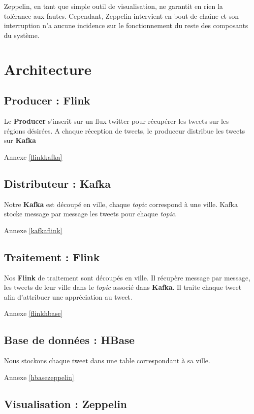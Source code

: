 \documentclass[a4paper,oneside,12pt]{article}
\begin{document}
Zeppelin, en tant que simple outil de visualisation, ne garantit en rien la tolérance aux fautes. Cependant, Zeppelin intervient en bout de chaîne et son interruption n'a aucune incidence sur le fonctionnement du reste des composants du système. 

\pagebreak
\section{Architecture}

\subsection{Producer : Flink}

Le \textbf{Producer} s'inscrit sur un flux twitter pour récupérer les tweets sur les régions désirées. A chaque réception de tweets, le produceur distribue les tweets sur \textbf{Kafka}

Annexe \ref{flinkkafka}

\subsection{Distributeur : Kafka}

Notre \textbf{Kafka} est découpé en ville, chaque \textit{topic} correspond à une ville. Kafka stocke message par message les tweets pour chaque \textit{topic}. 

Annexe \ref{kafkaflink}

\subsection{Traitement : Flink}

Nos \textbf{Flink} de traitement sont découpés en ville. Il récupère message par message, les tweets de leur ville dans le \textit{topic} associé dans \textbf{Kafka}. Il traite chaque tweet afin d'attribuer une appréciation au tweet. 

Annexe \ref{flinkhbase}

\subsection{Base de données : HBase}

Nous stockons chaque tweet dans une table correspondant à sa ville. 

Annexe \ref{hbasezeppelin}

\subsection{Visualisation : Zeppelin}
\end{document}

